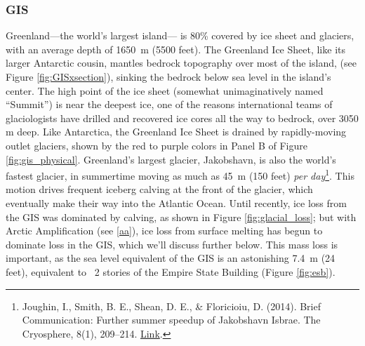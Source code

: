 \documentclass[amstex,12pt]{book}
\begin{document}
\subsubsection{GIS} Greenland---the world's largest island--- is 80\% covered by ice sheet and glaciers, with an average depth of \SI{1650}{\metre} (5500 feet). The Greenland Ice Sheet, like its larger Antarctic cousin, mantles bedrock topography over most of the island, (see Figure \ref{fig:GISxsection}), sinking the bedrock below sea level in the island's center. The high point of the ice sheet (somewhat unimaginatively named ``Summit'') is near the deepest ice, one of the reasons international teams of glaciologists have drilled and recovered ice cores all the way to bedrock, over 3050 m deep. Like Antarctica, the Greenland Ice Sheet is drained by rapidly-moving outlet glaciers, shown by the red to purple colors in Panel B of Figure \ref{fig:gis_physical}. Greenland's largest glacier, Jakobshavn, is also the world's fastest glacier, in summertime moving as much as \SI{45}{\metre} (150 feet) \textit{per day}\footnote{Joughin, I., Smith, B. E., Shean, D. E., \& Floricioiu, D. (2014). Brief Communication: Further summer speedup of Jakobshavn Isbrae. The Cryosphere, 8(1), 209–214. \href{https://doi.org/10.5194/tc-8-209-2014}{Link}.}. This motion drives frequent iceberg calving at the front of the glacier, which  eventually make their way into the Atlantic Ocean. Until recently, ice loss from the GIS was dominated by calving, as shown in Figure \ref{fig:glacial_loss}; but with Arctic Amplification (see \ref{aa}), ice loss from surface melting has begun to dominate loss in the GIS, which we'll discuss further below. This mass loss is important, as the sea level equivalent of the GIS is an astonishing \SI{7.4}{\metre} (24 feet), equivalent to ~2 stories of the Empire State Building (Figure \ref{fig:esb}).\\
\end{document}
